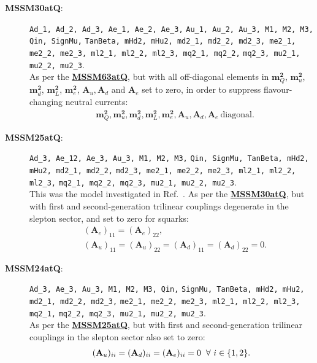 \documentclass[pdftex,twocolumn,epjc3_preprint,runningheads]{svjour3}
\renewcommand{\_}{\discretionary{\underscore}{}{\underscore}}
\newcommand\term[1]{{\lstset{style=terminal}\lstinline!#1!\lstset{style=cpp}}}
\newcommand{\doublecrosssf}[2]{\hyperref[#2]{\textbf{\textsf{#1}}}}
\newcommand{\gsfitemc}[1]{\item[\textbf{\textsf{#1}}\label{#1}:]}
\begin{document}
\begin{description}
\gsfitemc{MSSM30atQ} \term{Ad_1, Ad_2, Ad_3, Ae_1, Ae_2, Ae_3,}
                     \term{Au_1, Au_2, Au_3, M1, M2, M3, Qin, SignMu,}
                     \term{TanBeta, mHd2, mHu2, md2_1, md2_2, md2_3, me2_1,}
                     \term{me2_2, me2_3, ml2_1, ml2_2, ml2_3, mq2_1, mq2_2,}
                     \term{mq2_3, mu2_1, mu2_2, mu2_3}.\\
As per the \doublecrosssf{MSSM63atQ}{MSSM63atQ}, but with all off-diagonal elements in $\mathbf{m}^\mathbf{2}_Q$, $\mathbf{m}^\mathbf{2}_u$, $\mathbf{m}^\mathbf{2}_d$, $\mathbf{m}^\mathbf{2}_L$, $\mathbf{m}^\mathbf{2}_e$, $\mathbf{A}_u, \mathbf{A}_d$ and $\mathbf{A}_e$ set to zero, in order to suppress flavour-changing neutral currents:
\begin{align}
&\mathbf{m}^\mathbf{2}_Q, \mathbf{m}^\mathbf{2}_u, \mathbf{m}^\mathbf{2}_d, \mathbf{m}^\mathbf{2}_L, \mathbf{m}^\mathbf{2}_e, \mathbf{A}_u, \mathbf{A}_d, \mathbf{A}_e\ \mathrm{diagonal}.
\end{align}

\gsfitemc{MSSM25atQ} \term{Ad_3, Ae_12, Ae_3, Au_3, M1, M2, M3,}
                     \term{Qin, SignMu, TanBeta, mHd2, mHu2, md2_1, md2_2,}
                     \term{md2_3, me2_1, me2_2, me2_3, ml2_1, ml2_2, ml2_3,}
                     \term{mq2_1, mq2_2, mq2_3, mu2_1, mu2_2, mu2_3}.\\
This was the model investigated in Ref.\ \cite{Silverwood12}.  As per the \doublecrosssf{MSSM30atQ}{MSSM30atQ}, but with first and second-generation trilinear couplings degenerate in the slepton sector, and set to zero for squarks:
\begin{align}
&(\mathbf{A}_e)_{11} = (\mathbf{A}_e)_{22}, \\
&(\mathbf{A}_u)_{11} = (\mathbf{A}_u)_{22} = (\mathbf{A}_d)_{11} = (\mathbf{A}_d)_{22} = 0.
\end{align}

\gsfitemc{MSSM24atQ} \term{Ad_3, Ae_3, Au_3, M1, M2, M3, Qin,}
                     \term{SignMu, TanBeta, mHd2, mHu2, md2_1, md2_2, md2_3,}
                     \term{me2_1, me2_2, me2_3, ml2_1, ml2_2, ml2_3, mq2_1,}
                     \term{mq2_2, mq2_3, mu2_1, mu2_2, mu2_3}.\\
As per the \doublecrosssf{MSSM25atQ}{MSSM25atQ}, but with first and second-generation trilinear couplings in the slepton sector also set to zero:
\begin{align}
(\mathbf{A}_u)_{ii} = (\mathbf{A}_d)_{ii} = (\mathbf{A}_e)_{ii} = 0 \hspace{2mm} \forall\ i\in\{1,2\}.
\end{align}


\end{description}
\end{document}
